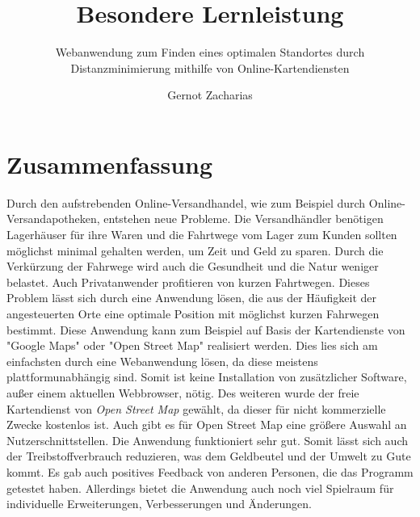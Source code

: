 \documentclass[a4paper, 12pt]{scrreprt}
\title{Besondere Lernleistung}
\author{Gernot Zacharias}
\subtitle{Webanwendung zum Finden eines optimalen Standortes durch Distanzminimierung mithilfe von Online-Kartendiensten}
\begin{document}
\maketitle
\cleardoublepage
\tableofcontents
\setcounter{page}{1}
\chapter*{Zusammenfassung}
Durch den aufstrebenden Online-Versandhandel, wie zum Beispiel durch Online-Versandapotheken, entstehen neue Probleme.
Die Versandhändler benötigen Lagerhäuser für ihre Waren und die Fahrtwege vom Lager zum Kunden sollten möglichst minimal gehalten werden, um Zeit und Geld zu sparen.
Durch die Verkürzung der Fahrwege wird auch die Gesundheit und die Natur weniger belastet.
Auch Privatanwender profitieren von kurzen Fahrtwegen.
Dieses Problem lässt sich durch eine Anwendung lösen, die aus der Häufigkeit der angesteuerten Orte eine optimale Position mit möglichst kurzen Fahrwegen bestimmt.
Diese Anwendung kann zum Beispiel auf Basis der Kartendienste von "Google Maps" oder "Open Street Map" realisiert werden.
Dies lies sich am einfachsten durch eine Webanwendung lösen, da diese meistens plattformunabhängig sind.
Somit ist keine Installation von zusätzlicher Software, außer einem aktuellen Webbrowser, nötig.
Des weiteren wurde der freie Kartendienst von \emph{Open Street Map} gewählt, da dieser für nicht kommerzielle Zwecke kostenlos ist.
Auch gibt es für Open Street Map eine größere Auswahl an Nutzerschnittstellen.
Die Anwendung funktioniert sehr gut.%
Somit lässt sich auch der Treibstoffverbrauch reduzieren, was dem Geldbeutel und der Umwelt zu Gute kommt.
Es gab auch positives Feedback von anderen Personen, die das Programm getestet haben.
Allerdings bietet die Anwendung auch noch viel Spielraum für individuelle Erweiterungen, Verbesserungen und Änderungen.
\end{document}
